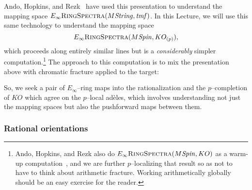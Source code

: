 Ando, Hopkins, and Rezk~\cite{AHR} have used this presentation to understand the mapping space \(E_\infty\normalfont\textsc{RingSpectra}(M\mathit{String}, \mathit{tmf})\).  In this Lecture, we will use this same technology to understand the mapping space \[E_\infty\normalfont\textsc{RingSpectra}(M\mathit{Spin}, KO_{(p)}),\] which proceeds along entirely similar lines but is a \emph{considerably} simpler computation.\footnote{Ando, Hopkins, and Rezk also do \(E_\infty\normalfont\textsc{RingSpectra}(M\mathit{Spin}, KO)\) as a warm-up computation~\cite[Section 7]{AHR}, and we are further \(p\)--localizing that result so as not to have to think about arithmetic fracture.  Working arithmetically globally should be an easy exercise for the reader.}  The approach to this computation is to mix the presentation above with chromatic fracture applied to the target:
\begin{center}
\end{center}
So, we seek a pair of \(E_\infty\)--ring maps into the rationalization and the \(p\)--completion of \(KO\) which agree on the \(p\)--local ad\`eles, which involves understanding not just the mapping spaces but also the pushforward maps between them.





\subsubsection{Rational orientations}

